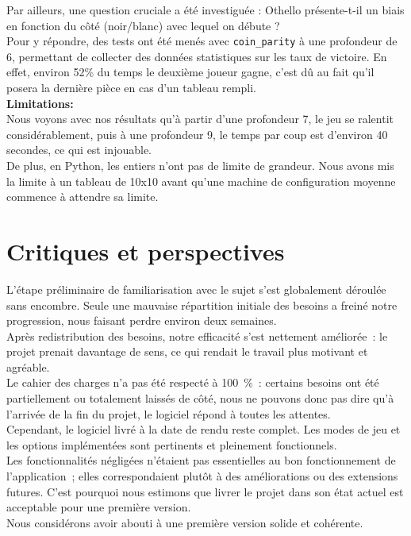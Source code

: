 \documentclass[a4paper,12pt]{article}
\begin{document}
\FloatBarrier

Par ailleurs, une question cruciale a été investiguée : Othello présente-t-il
un biais en fonction du côté (noir/blanc) avec lequel on débute ?\\ Pour y
répondre, des tests ont été menés avec \texttt{coin\_parity} à une profondeur
de 6, permettant de collecter des données statistiques sur les taux de
victoire. En effet, environ 52\% du temps le deuxième joueur gagne, c’est dû au
fait qu'il posera la dernière pièce en cas d’un tableau rempli.\\

\textbf{Limitations:}\\

Nous voyons avec nos résultats qu'à partir d’une profondeur 7, le jeu se
ralentit considérablement, puis à une profondeur 9, le temps par coup est
d'environ 40 secondes, ce qui est injouable.\\ De plus, en Python, les entiers
n’ont pas de limite de grandeur. Nous avons mis la limite à un tableau de 10x10
avant qu'une machine de configuration moyenne commence à attendre sa limite.\\

\newpage

\section{Critiques et perspectives}
L’étape préliminaire de familiarisation avec le sujet s’est globalement
déroulée sans encombre. Seule une mauvaise répartition initiale des besoins a
freiné notre progression, nous faisant perdre environ deux semaines.\\ Après
redistribution des besoins, notre efficacité s’est nettement améliorée~: le
projet prenait davantage de sens, ce qui rendait le travail plus motivant et
agréable.\\

Le cahier des charges n’a pas été respecté à 100~\%~: certains besoins ont été
partiellement ou totalement laissés de côté, nous ne pouvons donc pas dire qu’à
l’arrivée de la fin du projet, le logiciel répond à toutes les attentes.\\

Cependant, le logiciel livré à la date de rendu reste complet. Les modes de jeu
et les options implémentées sont pertinents et pleinement fonctionnels.\\ Les
fonctionnalités négligées n’étaient pas essentielles au bon fonctionnement de
l’application~; elles correspondaient plutôt à des améliorations ou des
extensions futures. C’est pourquoi nous estimons que livrer le projet dans son
état actuel est acceptable pour une première version.\\ Nous considérons avoir
abouti à une première version solide et cohérente.\\
\end{document}
